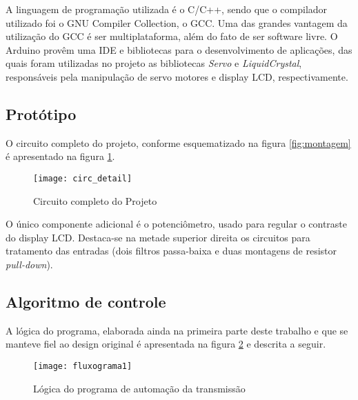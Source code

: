 \documentclass[a4paper,11pt]{article}
\begin{document}
A linguagem de programação utilizada é o C/C++, sendo que o compilador
utilizado foi o GNU Compiler Collection, o GCC\cite{gcc}. Uma das grandes
vantagem da utilização do GCC é ser multiplataforma, além do fato de ser
software livre. O Arduino provêm uma IDE e bibliotecas para o desenvolvimento
de aplicações, das quais foram utilizadas no projeto as bibliotecas
\textit{Servo} e \textit{LiquidCrystal}, responsáveis pela manipulação de servo
motores e display LCD, respectivamente.

%
\subsection{Protótipo}
\label{sec:prototipo}
O circuito completo do projeto, conforme esquematizado na figura
\ref{fig:montagem} é apresentado na figura \ref{fig:circuito}.
\begin{figure}[h]
\begin{center}
 \texttt{[image: circ\_detail]}
\end{center}
  \caption{Circuito completo do Projeto}
  \label{fig:circuito}
\end{figure}
O único componente adicional é o potenciômetro, usado para regular o contraste
do display LCD. Destaca-se na metade superior direita os circuitos para
tratamento das entradas (dois filtros passa-baixa e duas montagens de resistor
\textit{pull-down}).

%

\subsection{Algoritmo de controle}
\label{sec:software}
A lógica do programa, elaborada ainda na primeira parte deste trabalho e que se
manteve fiel ao design original é apresentada na figura \ref{fig:fluxograma1} e
descrita a seguir.

\begin{figure}[hb!]
 \begin{center}
  \texttt{[image: fluxograma1]}
 \end{center}
 \caption{Lógica do programa de automação da transmissão}
 \label{fig:fluxograma1}
\end{figure}
\end{document}
